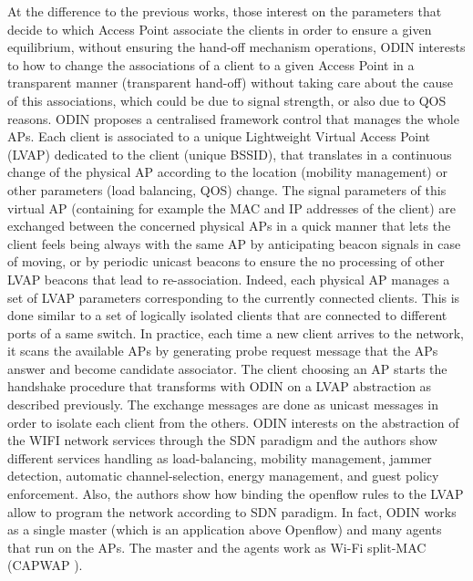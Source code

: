 \documentclass[journal,transmag]{IEEEtran}
\begin{document}
At the difference to the previous works, those interest on the parameters that decide to which Access Point associate the clients in order to ensure a given equilibrium, without ensuring the hand-off mechanism operations, ODIN interests to how to change the associations of a client to a given Access Point in a transparent manner (transparent hand-off) without taking care about the cause of this associations, which could be due to signal strength, or also due to QOS reasons. ODIN proposes a centralised framework control that manages the whole APs. Each client is associated to a unique Lightweight Virtual Access Point (LVAP) dedicated to the client (unique BSSID), that translates in a continuous change of the physical AP according to the location (mobility management) or other parameters (load balancing, QOS) change. The signal parameters of this virtual AP (containing for example the MAC and IP addresses of the client) are exchanged between the concerned physical APs in a quick manner that lets the client feels being always with the same AP by anticipating beacon signals in case of moving, or by periodic unicast beacons to ensure the no processing of other LVAP beacons that lead to re-association. Indeed, each physical AP manages a set of LVAP parameters corresponding to the currently connected clients. This is done similar to a set of logically isolated clients that are connected to different ports of a same switch. 
In practice, each time a new client arrives to the network, it scans the available APs by generating probe request message that the APs answer and become candidate associator. The client choosing an AP starts the handshake procedure that transforms with ODIN on a LVAP abstraction as described previously. The exchange messages are done as unicast messages in order to isolate each client from the others. ODIN interests on the abstraction of the WIFI network services through the SDN paradigm and the authors show different services handling as load-balancing, mobility management, jammer detection, automatic channel-selection, energy management, and guest policy enforcement. Also, the authors show how binding the openflow rules to the LVAP allow to program the network according to SDN paradigm. In fact, ODIN works as a single master (which is an application above Openflow) and many agents that run on the APs. The master and the agents work as Wi-Fi split-MAC (CAPWAP \cite{09CAPWAP}). \\
\end{document}
